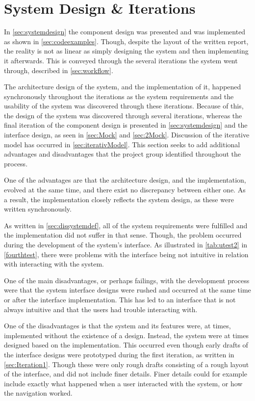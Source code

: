 \section{System Design \& Iterations}\label{sec:dissystemdes}

In \cref{sec:systemdesign} the component design was presented and was implemented as shown in \cref{sec:codeexamples}.
Though, despite the layout of the written report, the reality is not as linear as simply designing the system and then implementing it afterwards.
This is conveyed through the several iterations the system went through, described in \cref{sec:workflow}.

The architecture design of the system, and the implementation of it, happened synchronously throughout the iterations as the system requirements and the usability of the system was discovered through these iterations.
Because of this, the design of the system was discovered through several iterations, whereas the final iteration of the component design is presented in \cref{sec:systemdesign} and the interface design, as seen in \cref{sec:Mock} and \ref{sec:2Mock}.
Discussion of the iterative model has occurred in \cref{sec:iterativModel}.
This section seeks to add additional advantages and disadvantages that the project group identified throughout the process.

One of the advantages are that the architecture design, and the implementation, evolved at the same time, and there exist no discrepancy between either one.
As a result, the implementation closely reflects the system design, as these were written synchronously.

As written in \cref{sec:dissystemdef}, all of the system requirements were fulfilled and the implementation did not suffer in that sense.
Though, the problem occurred during the development of the system's interface.
As illustrated in \cref{tab:utest2} in \cref{fourthtest}, there were problems with the interface being not intuitive in relation with interacting with the system.

One of the main disadvantages, or perhaps failings, with the development process were that the system interface designs were rushed and occurred at the same time or after the interface implementation.
This has led to an interface that is not always intuitive and that the users had trouble interacting with.

One of the disadvantages is that the system and its features were, at times, implemented without the existence of a design.
Instead, the system were at times designed based on the implementation.
This occurred even though early drafts of the interface designs were prototyped during the first iteration, as written in \cref{sec:Iteration1}.
Though these were only rough drafts consisting of a rough layout of the interface, and did not include finer details.
Finer details could for example include exactly what happened when a user interacted with the system, or how the navigation worked.

